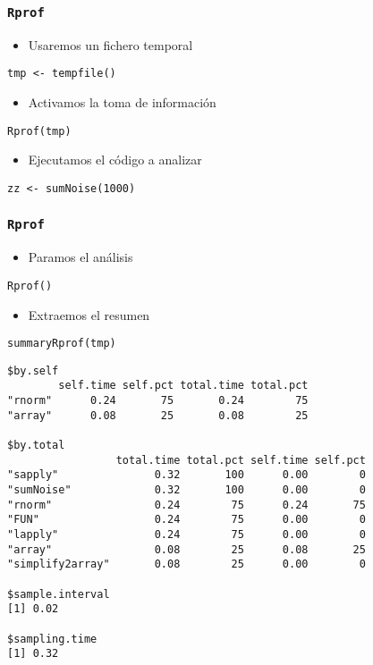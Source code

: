 \documentclass[xcolor={usenames,svgnames,dvipsnames}]{beamer}
\begin{document}
\begin{frame}[fragile]
\frametitle{\texttt{Rprof}}
\label{sec-3-4}

\begin{itemize}
\item Usaremos un fichero temporal
\end{itemize}

\lstset{language=R}
\begin{lstlisting}
tmp <- tempfile()
\end{lstlisting}


\begin{itemize}
\item Activamos la toma de información
\end{itemize}

\lstset{language=R}
\begin{lstlisting}
Rprof(tmp)
\end{lstlisting}


\begin{itemize}
\item Ejecutamos el código a analizar
\end{itemize}

\lstset{language=R}
\begin{lstlisting}
zz <- sumNoise(1000)
\end{lstlisting}
\end{frame}
\begin{frame}[fragile]
\frametitle{\texttt{Rprof}}
\label{sec-3-5}

\begin{itemize}
\item Paramos el análisis
\end{itemize}

\lstset{language=R}
\begin{lstlisting}
Rprof()
\end{lstlisting}


\begin{itemize}
\item Extraemos el resumen
\end{itemize}

\lstset{language=R}
\begin{lstlisting}
summaryRprof(tmp)
\end{lstlisting}


\begin{verbatim}
$by.self
        self.time self.pct total.time total.pct
"rnorm"      0.24       75       0.24        75
"array"      0.08       25       0.08        25

$by.total
                 total.time total.pct self.time self.pct
"sapply"               0.32       100      0.00        0
"sumNoise"             0.32       100      0.00        0
"rnorm"                0.24        75      0.24       75
"FUN"                  0.24        75      0.00        0
"lapply"               0.24        75      0.00        0
"array"                0.08        25      0.08       25
"simplify2array"       0.08        25      0.00        0

$sample.interval
[1] 0.02

$sampling.time
[1] 0.32
\end{verbatim}
\end{frame}
\end{document}
